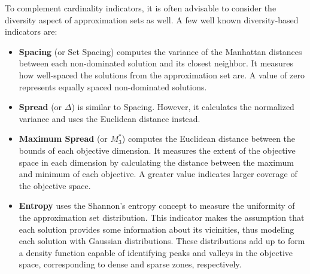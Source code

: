 	To complement cardinality indicators, it is often advisable to consider the diversity aspect of approximation sets as well. A few well known diversity-based indicators are:
	\begin{itemize}
		\item  \textbf{Spacing} (or Set Spacing) computes the variance of the Manhattan distances between each non-dominated solution and its closest neighbor. It measures how well-spaced the solutions from the approximation set are. A value of zero represents equally spaced non-dominated solutions. 
		\item \textbf{Spread} (or $\Delta$) is similar to Spacing. However, it calculates the normalized variance and uses the Euclidean distance instead.
		\item \textbf{Maximum Spread} (or \textbf{$M_3^\ast$}) computes the Euclidean distance between the bounds of each objective dimension. It measures the extent of the objective space in each dimension by calculating the distance between the maximum and minimum of each objective. A greater value indicates larger coverage of the objective space.
		
		\item \textbf{Entropy} uses the Shannon's entropy concept to measure the uniformity of the approximation set distribution. This indicator makes the assumption that each solution provides some information about its vicinities, thus modeling each solution with Gaussian distributions. These distributions add up to form a density function capable of identifying peaks and valleys in the objective space, corresponding to dense and sparse zones, respectively. 
		

\end{itemize}
